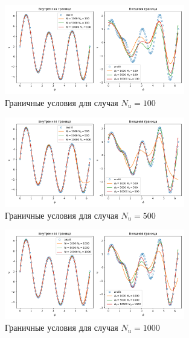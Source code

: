\documentclass[a4paper,14pt]{extarticle} %
\begin{document}
\begin{figure}[ht]
    \center
    \includegraphics[width=0.7\textwidth]{../plots/termal/bnd l = (20x4) Nf=[1000, 5000, 10000] Nu=100.png}
    \caption{Граничные условия для случая $N_u=100$}
    \label{fig:termal_bnd1}
\end{figure}
\begin{figure}[ht]
    \center
    \includegraphics[width=0.7\textwidth]{../plots/termal/bnd l = (20x4) Nf=[1000, 5000, 10000] Nu=500.png}
    \caption{Граничные условия для случая $N_u=500$}
    \label{fig:termal_bnd2}
\end{figure}
\begin{figure}[ht]
    \center
    \includegraphics[width=0.7\textwidth]{../plots/termal/bnd l = (20x4) Nf=[1000, 5000, 10000] Nu=1000.png}
    \caption{Граничные условия для случая $N_u=1000$}
    \label{fig:termal_bnd3}
\end{figure}
\FloatBarrier

\end{document}
